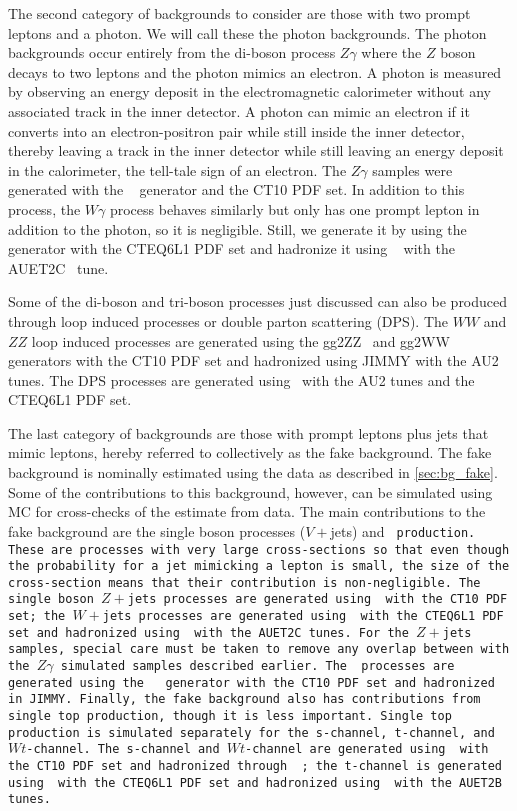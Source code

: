 The second category of backgrounds to consider are those with two 
prompt leptons and a photon. We will call these the photon backgrounds.
The photon backgrounds occur entirely from the di-boson process $Z\gamma$
where the $Z$ boson decays to two leptons and the photon mimics an electron.
A photon is measured
by observing an energy deposit in the electromagnetic calorimeter 
without any associated track in the inner detector.
A photon can mimic an electron
if it converts into an electron-positron
pair while still inside the inner detector, thereby leaving a track 
in the inner detector while still leaving an energy deposit in the 
calorimeter, the tell-tale sign of an electron.
The $Z\gamma$ samples were generated with the \sherpa~\cite{sherpa} generator 
and the CT10 PDF set.  %
In addition to this process, the $W\gamma$ process behaves similarly 
but only has one prompt lepton in addition to the photon, so it is negligible.
Still, we generate it by using
the \alpgen~\cite{ALPGEN} generator with the CTEQ6L1 PDF set
and hadronize it using \jimmy~\cite{Jimmy} with the AUET2C~\cite{atlas:2011zja} 
tune.

Some of the di-boson and tri-boson processes just discussed can also be produced
through loop induced processes or double parton scattering (DPS).
The $WW$ and $ZZ$
loop induced processes are generated using the gg2ZZ~\cite{Binoth:2008pr} 
and gg2WW~\cite{Binoth:2006mf} generators with the CT10 PDF set and
hadronized using JIMMY with the AU2 tunes.
The DPS
processes are generated using \pythiaeight~with the AU2 
tunes and the CTEQ6L1 PDF set. 

The last category of backgrounds are those with prompt leptons plus
jets that mimic leptons, hereby 
referred to collectively as the fake background. 
The fake background is nominally estimated using the data
as described in \sec\ref{sec:bg_fake}. Some of the contributions
to this background, however, can be simulated using MC 
for cross-checks of 
the estimate from data. The main contributions
to the fake background
are the single boson processes ($V+$jets) and \tt~production.
These are processes with very large cross-sections so
that even though the probability for a jet mimicking a lepton is small,
the size of the cross-section means that their contribution is non-negligible.
The single boson $Z+$jets processes are generated using \sherpa~with the CT10
PDF set; the $W+$jets processes are generated using \alpgen~with
the CTEQ6L1 PDF set and hadronized using \jimmy~with the AUET2C tunes.
For the $Z+$jets samples, special care must be taken to remove any overlap 
between with the $Z\gamma$ simulated samples described earlier.
The \tt~processes are generated using the \mcatnlo~\cite{MCatNLO}
generator with the CT10 PDF set and hadronized in JIMMY.  %
Finally, the fake background also has contributions from single top production,
though it is less important. Single top production is simulated separately 
for the s-channel, t-channel, and $Wt$-channel. The s-channel 
and $Wt$-channel are generated using \mcatnlo~with the CT10 PDF set and 
hadronized through \jimmy~; the t-channel is generated using 
\madgraph~with the CTEQ6L1 PDF set and hadronized 
using \pythiasix~with the AUET2B tunes.

